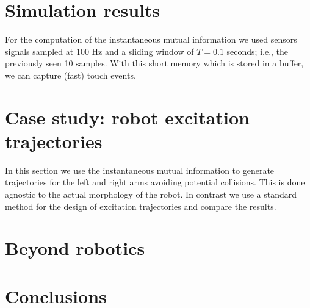 \section{Simulation results}
\TODO
For the computation of the instantaneous mutual information we used sensors signals sampled at 100 Hz and a sliding window of $T = 0.1$ seconds; i.e., the previously seen 10 samples. With this short memory which is stored in a buffer, we can capture (fast) touch events.

\section{Case study: robot excitation trajectories}
\TODO
In this section we use the instantaneous mutual information to generate trajectories for the left and right arms avoiding potential collisions. This is done agnostic to the actual morphology of the robot. In contrast we use a standard method for the design of excitation trajectories and compare the results.

\section{Beyond robotics}
\TODO

\section{Conclusions}\label{sec:conclusion}



\printbibliography 
